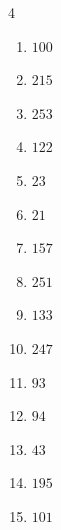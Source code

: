 \begin{multicols}{4}
\begin{enumerate}
  \item $100$


  \item $215$


  \item $253$


  \item $122$


  \item $23$


  \item $21$


  \item $157$


  \item $251$


  \item $133$


\columnbreak %

\resetques

  \item $247$


  \item $93$


  \item $94$


  \item $43$


  \item $195$


  \item $101$



\end{enumerate}
\end{multicols}
